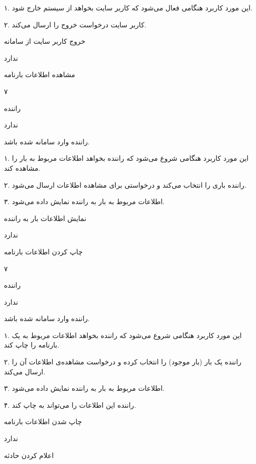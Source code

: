 
۱. این مورد کاربرد هنگامی فعال می‌شود که کاربر سایت بخواهد از سیستم خارج شود.

۲. کاربر سایت درخواست خروج را ارسال می‌کند.

خروج کاربر سایت از سامانه 

ندارد

\noindent \hrulefill

مشاهده اطلاعات بارنامه

۷

راننده

ندارد

راننده وارد سامانه شده باشد.


۱. این مورد کاربرد هنگامی شروع می‌شود که راننده بخواهد اطلاعات مربوط به بار را مشاهده کند.

۲. راننده باری را انتخاب می‌کند و درخواستی برای مشاهده اطلاعات ارسال می‌شود.

۳. اطلاعات مربوط به بار به راننده نمایش داده می‌شود.

نمایش اطلاعات بار به راننده

ندارد

\noindent \hrulefill

چاپ کردن اطلاعات بارنامه

۷

راننده

ندارد

راننده وارد سامانه شده باشد.


۱. این مورد کاربرد هنگامی شروع می‌شود که راننده بخواهد اطلاعات مربوط به یک بارنامه را چاپ کند. 

۲. راننده یک بار (بار موجود) را انتخاب کرده و درخواست مشاهده‌ی اطلاعات آن را ارسال می‌کند.

۳. اطلاعات مربوط به بار به راننده نمایش داده می‌شود.

۴. راننده این اطلاعات را می‌تواند به چاپ کند.

چاپ شدن اطلاعات بارنامه

ندارد

\noindent \hrulefill

اعلام کردن حادثه

